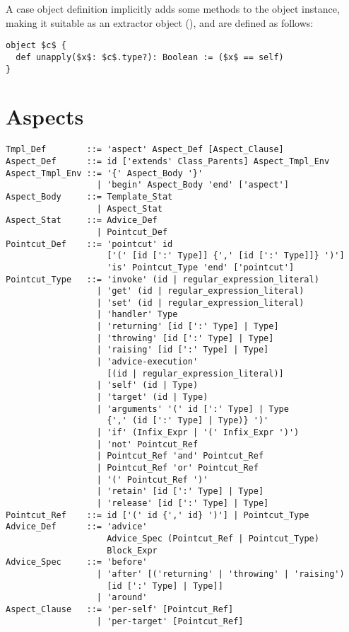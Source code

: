 A case object definition implicitly adds some methods to the object instance, making it suitable as an extractor object (), and are defined as follows:
\begin{lstlisting}
object $c$ {
  def unapply($x$: $c$.type?): Boolean := ($x$ == self)
}
\end{lstlisting}







\section{Aspects}
\label{sec:aspects}

\syntax\begin{lstlisting}
Tmpl_Def        ::= 'aspect' Aspect_Def [Aspect_Clause]
Aspect_Def      ::= id ['extends' Class_Parents] Aspect_Tmpl_Env
Aspect_Tmpl_Env ::= '{' Aspect_Body '}'
                  | 'begin' Aspect_Body 'end' ['aspect']
Aspect_Body     ::= Template_Stat 
                  | Aspect_Stat
Aspect_Stat     ::= Advice_Def
                  | Pointcut_Def
Pointcut_Def    ::= 'pointcut' id
                    ['(' [id [':' Type]] {',' [id [':' Type]]} ')']
                    'is' Pointcut_Type 'end' ['pointcut']
Pointcut_Type   ::= 'invoke' (id | regular_expression_literal)
                  | 'get' (id | regular_expression_literal)
                  | 'set' (id | regular_expression_literal)
                  | 'handler' Type
                  | 'returning' [id [':' Type] | Type]
                  | 'throwing' [id [':' Type] | Type]
                  | 'raising' [id [':' Type] | Type]
                  | 'advice-execution' 
                    [(id | regular_expression_literal)]
                  | 'self' (id | Type)
                  | 'target' (id | Type)
                  | 'arguments' '(' id [':' Type] | Type 
                    {',' (id [':' Type] | Type)} ')'
                  | 'if' (Infix_Expr | '(' Infix_Expr ')')
                  | 'not' Pointcut_Ref
                  | Pointcut_Ref 'and' Pointcut_Ref
                  | Pointcut_Ref 'or' Pointcut_Ref
                  | '(' Pointcut_Ref ')'
                  | 'retain' [id [':' Type] | Type]
                  | 'release' [id [':' Type] | Type]
Pointcut_Ref    ::= id ['(' id {',' id} ')'] | Pointcut_Type
Advice_Def      ::= 'advice' 
                    Advice_Spec (Pointcut_Ref | Pointcut_Type)
                    Block_Expr
Advice_Spec     ::= 'before' 
                  | 'after' [('returning' | 'throwing' | 'raising') 
                    [id [':' Type] | Type]]
                  | 'around'
Aspect_Clause   ::= 'per-self' [Pointcut_Ref] 
                  | 'per-target' [Pointcut_Ref] 
\end{lstlisting}

